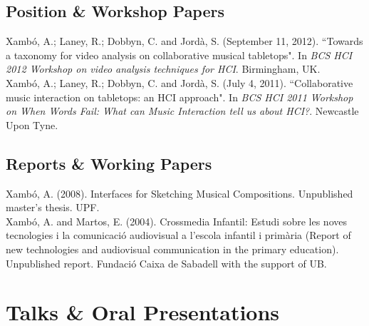 \documentclass[10pt, a4paper]{article}
\newcommand{\years}[1]{\marginnote{\scriptsize #1}}
\begin{document}
\subsection*{Position \& Workshop Papers}
\noindent

\years{2012}Xambó, A.; Laney, R.; Dobbyn, C. and Jordà, S. (September 11, 2012). “Towards a taxonomy for video analysis on collaborative musical tabletops". In \emph{BCS HCI 2012 Workshop on video analysis techniques for HCI}. Birmingham, UK.\\
\years{2011}Xambó, A.; Laney, R.; Dobbyn, C. and Jordà, S. (July 4, 2011). “Collaborative music interaction on tabletops: an HCI approach". In \emph{BCS HCI 2011 Workshop on When Words Fail: What can Music Interaction tell us about HCI?}. Newcastle Upon Tyne.

\subsection*{Reports \& Working Papers}
\noindent

\years{2008}Xambó, A. (2008). Interfaces for Sketching Musical Compositions. Unpublished master's thesis. UPF.\\ 
\years{2004}Xambó, A. and Martos, E. (2004). Crossmedia Infantil: Estudi sobre les noves tecnologies i la comunicació audiovisual a l'escola infantil i primària (Report of new technologies and audiovisual communication in the primary education). Unpublished report. Fundació Caixa de Sabadell with the support of UB.



\section*{Talks \& Oral Presentations}
\end{document}

